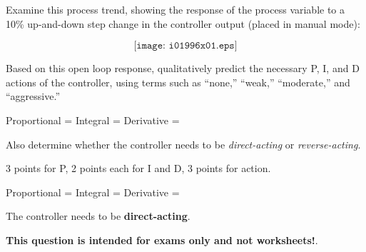 

Examine this process trend, showing the response of the process variable to a 10\% up-and-down step change in the controller output (placed in manual mode):

$$\texttt{[image: i01996x01.eps]}$$

Based on this open loop response, qualitatively predict the necessary P, I, and D actions of the controller, using terms such as ``none,'' ``weak,'' ``moderate,'' and ``aggressive.''

\vskip 10pt

Proportional = \underbar{\hskip 70pt} \hskip 20pt Integral = \underbar{\hskip 70pt} \hskip 20pt Derivative = \underbar{\hskip 70pt}

\vskip 10pt

Also determine whether the controller needs to be {\it direct-acting} or {\it reverse-acting}.







3 points for P, 2 points each for I and D, 3 points for action.

\vskip 10pt

\noindent
Proportional =  \hskip 10pt Integral =  \hskip 10pt Derivative = 

\vskip 10pt

The controller needs to be {\bf direct-acting}.







{\bf This question is intended for exams only and not worksheets!}.



